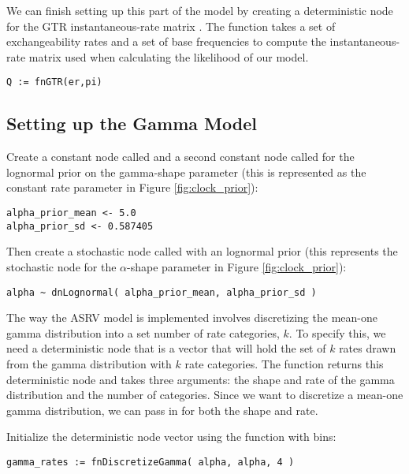 We can finish setting up this part of the model by creating a deterministic node for the GTR instantaneous-rate matrix . 
The  function takes a set of exchangeability rates and a set of base frequencies to compute the instantaneous-rate matrix used when calculating the likelihood of our model.
{\tt \begin{snugshade*}
\begin{lstlisting}
Q := fnGTR(er,pi)
\end{lstlisting}
\end{snugshade*}}


\subsection{Setting up the Gamma Model}

Create a constant node called  and a second constant node called  for the lognormal prior on the gamma-shape parameter (this is represented as the constant rate parameter in Figure \ref{fig:clock_prior}):
{\tt\begin{snugshade*}
\begin{lstlisting}
alpha_prior_mean <- 5.0
alpha_prior_sd <- 0.587405
\end{lstlisting}
\end{snugshade*}}

Then create a stochastic node called  with an lognormal prior (this represents the stochastic node for the $\alpha$-shape parameter in Figure \ref{fig:clock_prior}):
{\tt\begin{snugshade*}
\begin{lstlisting}
alpha ~ dnLognormal( alpha_prior_mean, alpha_prior_sd )
\end{lstlisting}
\end{snugshade*}}

The way the ASRV model is implemented involves discretizing the mean-one gamma distribution into a set number of rate categories, $k$. 
To specify this, we need a deterministic node that is a vector that will hold the set of $k$ rates drawn from the gamma distribution with $k$ rate categories. 
The  function returns this deterministic node and takes three arguments: the shape and rate of the gamma distribution and the number of categories. 
Since we want to discretize a mean-one gamma distribution, we can pass in  for both the shape and rate.

Initialize the  deterministic node vector using the   function with  bins:
{\tt \begin{snugshade*}
\begin{lstlisting}
gamma_rates := fnDiscretizeGamma( alpha, alpha, 4 )
\end{lstlisting}
\end{snugshade*}}

